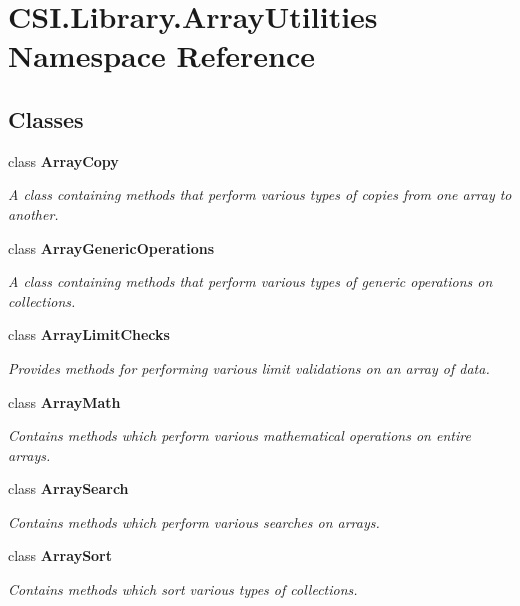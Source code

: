 \hypertarget{namespace_c_s_i_1_1_library_1_1_array_utilities}{}\section{C\+S\+I.\+Library.\+Array\+Utilities Namespace Reference}
\label{namespace_c_s_i_1_1_library_1_1_array_utilities}
\subsection*{Classes}
\begin{DoxyCompactItemize}
\item 
class {\bfseries Array\+Copy}
\begin{DoxyCompactList}\small\item\em A class containing methods that perform various types of copies from one array to another. \end{DoxyCompactList}\item 
class {\bfseries Array\+Generic\+Operations}
\begin{DoxyCompactList}\small\item\em A class containing methods that perform various types of generic operations on collections. \end{DoxyCompactList}\item 
class {\bfseries Array\+Limit\+Checks}
\begin{DoxyCompactList}\small\item\em Provides methods for performing various limit validations on an array of data. \end{DoxyCompactList}\item 
class {\bfseries Array\+Math}
\begin{DoxyCompactList}\small\item\em Contains methods which perform various mathematical operations on entire arrays. \end{DoxyCompactList}\item 
class {\bfseries Array\+Search}
\begin{DoxyCompactList}\small\item\em Contains methods which perform various searches on arrays. \end{DoxyCompactList}\item 
class {\bfseries Array\+Sort}
\begin{DoxyCompactList}\small\item\em Contains methods which sort various types of collections. \end{DoxyCompactList}\end{DoxyCompactItemize}
